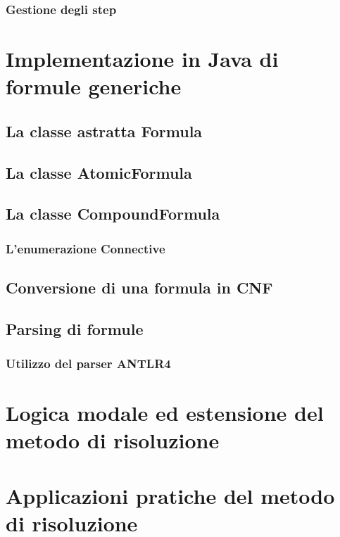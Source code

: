 \documentclass[a4paper,12pt]{report}
\begin{document}
\subsection{Gestione degli step}
\label{step}

% 
% 
\chapter{Implementazione in Java di formule generiche}
\label{formulas}

\section{La classe astratta Formula}

\section{La classe AtomicFormula}

\section{La classe CompoundFormula}
\subsection{L'enumerazione Connective}

\section{Conversione di una formula in CNF}

\section{Parsing di formule}
\subsection{Utilizzo del parser ANTLR4}

% 
% 
\chapter{Logica modale ed estensione del metodo di risoluzione}
\label{modal}



% 
% 
\chapter{Applicazioni pratiche del metodo di risoluzione}
\label{app}
\end{document}
